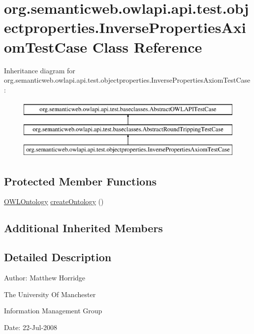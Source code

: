 \hypertarget{classorg_1_1semanticweb_1_1owlapi_1_1api_1_1test_1_1objectproperties_1_1_inverse_properties_axiom_test_case}{\section{org.\-semanticweb.\-owlapi.\-api.\-test.\-objectproperties.\-Inverse\-Properties\-Axiom\-Test\-Case Class Reference}
\label{classorg_1_1semanticweb_1_1owlapi_1_1api_1_1test_1_1objectproperties_1_1_inverse_properties_axiom_test_case}
}
Inheritance diagram for org.\-semanticweb.\-owlapi.\-api.\-test.\-objectproperties.\-Inverse\-Properties\-Axiom\-Test\-Case\-:\begin{figure}[H]
\begin{center}
\leavevmode
\includegraphics[height=3.000000cm]{classorg_1_1semanticweb_1_1owlapi_1_1api_1_1test_1_1objectproperties_1_1_inverse_properties_axiom_test_case}
\end{center}
\end{figure}
\subsection*{Protected Member Functions}
\begin{DoxyCompactItemize}
\item 
\hyperlink{interfaceorg_1_1semanticweb_1_1owlapi_1_1model_1_1_o_w_l_ontology}{O\-W\-L\-Ontology} \hyperlink{classorg_1_1semanticweb_1_1owlapi_1_1api_1_1test_1_1objectproperties_1_1_inverse_properties_axiom_test_case_a7388d54c1a1a120adf9345e8fdcd73d3}{create\-Ontology} ()
\end{DoxyCompactItemize}
\subsection*{Additional Inherited Members}


\subsection{Detailed Description}
Author\-: Matthew Horridge\par
 The University Of Manchester\par
 Information Management Group\par
 Date\-: 22-\/\-Jul-\/2008\par
 \par
 

